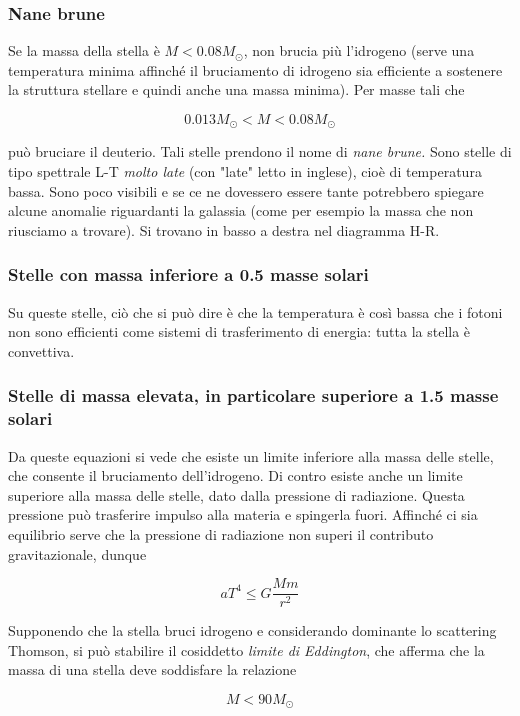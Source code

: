 \subsubsection{Nane brune}
Se la massa della stella è $M<0.08 M_{\odot}$, non brucia più l'idrogeno (serve una temperatura minima affinché il bruciamento di idrogeno sia efficiente a sostenere la struttura stellare e quindi anche una massa minima). Per masse tali che

$$0.013 M_{\odot}<M<0.08 M_{\odot}$$

può bruciare il deuterio. Tali stelle prendono il nome di \textit{nane brune.} Sono stelle di tipo spettrale L-T \textit{molto late} (con "late" letto in inglese), cioè di temperatura bassa. Sono poco visibili e se ce ne dovessero essere tante potrebbero spiegare alcune anomalie riguardanti la galassia (come per esempio la massa che non riusciamo a trovare). Si trovano in basso a destra nel diagramma H-R.

\subsubsection{Stelle con massa inferiore a 0.5 masse solari}

Su queste stelle, ciò che si può dire è che la temperatura è così bassa che i fotoni non sono efficienti come sistemi di trasferimento di energia: tutta la stella è convettiva.

\subsubsection{Stelle di massa elevata, in particolare superiore a 1.5 masse solari}

Da queste equazioni si vede che esiste un limite inferiore alla massa delle stelle, che consente il bruciamento dell'idrogeno. Di contro esiste anche un limite superiore alla massa delle stelle, dato dalla pressione di radiazione. Questa pressione può trasferire impulso alla materia e spingerla fuori. Affinché ci sia equilibrio serve che la pressione di radiazione non superi il contributo gravitazionale, dunque

$$aT^4 \leq G\frac{Mm}{r^2}$$

Supponendo che la stella bruci idrogeno e considerando dominante lo scattering Thomson, si può stabilire il cosiddetto \textit{limite di Eddington}, che afferma che la massa di una stella deve soddisfare la relazione

$$M<90M_{\odot}$$

